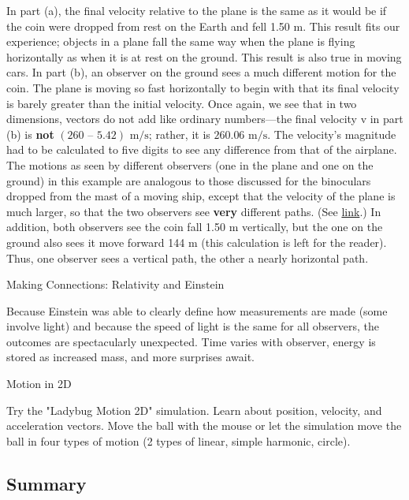 \documentclass[
]{book}
\begin{document}
In part (a), the final velocity relative to the plane is the same as it
would be if the coin were dropped from rest on the Earth and fell 1.50
m. This result fits our experience; objects in a plane fall the same way
when the plane is flying horizontally as when it is at rest on the
ground. This result is also true in moving cars. In part (b), an
observer on the ground sees a much different motion for the coin. The
plane is moving so fast horizontally to begin with that its final
velocity is barely greater than the initial velocity. Once again, we see
that in two dimensions, vectors do not add like ordinary numbers---the
final velocity v in part (b) is \textbf{not}
\({(\text{260\ –\ 5}\text{.}\text{42})\text{~m/s}}{}\); rather, it is
\({\text{260}\text{.}\text{06~m/s}}{}\). The velocity's magnitude had to
be calculated to five digits to see any difference from that of the
airplane. The motions as seen by different observers (one in the plane
and one on the ground) in this example are analogous to those discussed
for the binoculars dropped from the mast of a moving ship, except that
the velocity of the plane is much larger, so that the two observers see
\textbf{very} different paths. (See
\protect\hyperlink{import-auto-id1944737}{link}.) In addition,
both observers see the coin fall 1.50 m vertically, but the one on the
ground also sees it move forward 144 m (this calculation is left for the
reader). Thus, one observer sees a vertical path, the other a nearly
horizontal path.

\hypertarget{fs-id1820082}{}
Making Connections: Relativity and Einstein

Because Einstein was able to clearly define how measurements are made
(some involve light) and because the speed of light is the same for all
observers, the outcomes are spectacularly unexpected. Time varies with
observer, energy is stored as increased mass, and more surprises await.

\hypertarget{eip-584}{}
Motion in 2D

Try the "Ladybug Motion 2D" simulation. Learn about position,
velocity, and acceleration vectors. Move the ball with the mouse or let
the simulation move the ball in four types of motion (2 types of linear,
simple harmonic, circle).

\hypertarget{fs-id1167062339457}{}

\hypertarget{fs-id2070835-summary}{}
\hypertarget{summary-4}{%
\subsection{Summary}\label{summary-4}}
\end{document}
